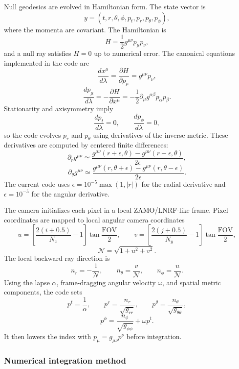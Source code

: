 \documentclass[11pt,a4paper]{article}
\begin{document}
Null geodesics are evolved in Hamiltonian form. The state vector is
\[
y=(t,r,\theta,\phi,p_t,p_r,p_\theta,p_\phi),
\]
where the momenta are covariant. The Hamiltonian is
\[
H=\frac{1}{2}g^{\mu\nu}p_\mu p_\nu,
\]
and a null ray satisfies $H=0$ up to numerical error. The canonical equations
implemented in the code are
\[
\frac{dx^\mu}{d\lambda}=\frac{\partial H}{\partial p_\mu}
=g^{\mu\nu}p_\nu,
\]
\[
\frac{dp_\mu}{d\lambda}=-\frac{\partial H}{\partial x^\mu}
=-\frac{1}{2}\partial_\mu g^{\alpha\beta}p_\alpha p_\beta.
\]
Stationarity and axisymmetry imply
\[
\frac{dp_t}{d\lambda}=0,\qquad
\frac{dp_\phi}{d\lambda}=0,
\]
so the code evolves $p_r$ and $p_\theta$ using derivatives of the inverse
metric. These derivatives are computed by centered finite differences:
\[
\partial_r g^{\mu\nu}\simeq
\frac{g^{\mu\nu}(r+\epsilon,\theta)-g^{\mu\nu}(r-\epsilon,\theta)}
{2\epsilon},
\]
\[
\partial_\theta g^{\mu\nu}\simeq
\frac{g^{\mu\nu}(r,\theta+\epsilon)-g^{\mu\nu}(r,\theta-\epsilon)}
{2\epsilon}.
\]
The current code uses $\epsilon=10^{-5}\max(1,|r|)$ for the radial derivative
and $\epsilon=10^{-5}$ for the angular derivative.

The camera initializes each pixel in a local ZAMO/LNRF-like frame. Pixel
coordinates are mapped to local angular camera coordinates
\[
u=\left[\frac{2(i+0.5)}{N_x}-1\right]\tan\frac{\mathrm{FOV}}{2},\qquad
v=\left[\frac{2(j+0.5)}{N_y}-1\right]\tan\frac{\mathrm{FOV}}{2},
\]
\[
\mathcal{N}=\sqrt{1+u^2+v^2}.
\]
The local backward ray direction is
\[
n_r=-\frac{1}{\mathcal{N}},\qquad
n_\theta=\frac{v}{\mathcal{N}},\qquad
n_\phi=\frac{u}{\mathcal{N}}.
\]
Using the lapse $\alpha$, frame-dragging angular velocity $\omega$, and
spatial metric components, the code sets
\[
p^t=\frac{1}{\alpha},\qquad
p^r=\frac{n_r}{\sqrt{g_{rr}}},\qquad
p^\theta=\frac{n_\theta}{\sqrt{g_{\theta\theta}}},
\]
\[
p^\phi=\frac{n_\phi}{\sqrt{g_{\phi\phi}}}+\omega p^t.
\]
It then lowers the index with $p_\mu=g_{\mu\nu}p^\nu$ before integration.

\subsubsection{Numerical integration method}
\end{document}
